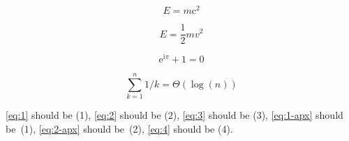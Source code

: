 \documentclass[12pt]{article}
\begin{document}
\begin{thmrep}
  \begin{equation}
    \label{eq:1}
    E=m\mathrm{c}^2
  \end{equation}
\end{thmrep}

\begin{thmrep}
  \begin{equation}
    \label{eq:2}
    E=\frac 1 2 mv^2
  \end{equation}
\end{thmrep}

\begin{equation}
  \mathrm{e}^{\mathrm{i}\pi}+1=0 \label{eq:3}
\end{equation}

\begin{toappendix}
  \begin{equation}
    \sum_{k=1}^{n} 1/k=\Theta(\log(n))\label{eq:4}
  \end{equation}
 
  \eqref{eq:1} should be (1), \eqref{eq:2} should be (2), \eqref{eq:3}
  should be (3), \eqref{eq:1-apx} should be~(1), \eqref{eq:2-apx} should
  be~(2), \eqref{eq:4} should be (4).
\end{toappendix}                  
\end{document}
